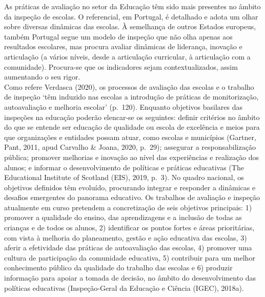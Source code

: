 \documentclass[
]{book}
\theoremstyle{definition}
\theoremstyle{definition}
\theoremstyle{definition}
\theoremstyle{definition}
\theoremstyle{remark}
\begin{document}
As práticas de avaliação no setor da Educação têm sido mais presentes no âmbito da inspeção de escolas. O referencial, em Portugal, é detalhado e adota um olhar sobre diversas dinâmicas das escolas. À semelhança de outros Estados europeus, também Portugal segue um modelo de inspeção que não olha apenas aos resultados escolares, mas procura avaliar dinâmicas de liderança, inovação e articulação (a vários níveis, desde a articulação curricular, à articulação com a comunidade). Procura-se que os indicadores sejam contextualizados, assim aumentando o seu rigor.\\
Como refere Verdasca (2020), os processos de avaliação das escolas e o trabalho de inspeção `têm induzido nas escolas a introdução de práticas de monitorização, autoavaliação e melhoria escolar' (p.~120). Enquanto objetivos basilares das inspeções na educação poderão elencar-se os seguintes: definir critérios no âmbito do que se entende ser educação de qualidade ou escola de excelência e meios para que organizações e entidades possam atuar, como escolas e municípios (Gartner, Pant, 2011, apud Carvalho \& Joana, 2020, p.~29); assegurar a responsabilização pública; promover melhorias e inovação ao nível das experiências e realização dos alunos; e informar o desenvolvimento de políticas e práticas educativas (The Educational Institute of Scotland (EIS), 2019, p.~3). No quadro nacional, os objetivos definidos têm evoluído, procurando integrar e responder a dinâmicas e desafios emergentes do panorama educativo. Os trabalhos de avaliação e inspeção atualmente em curso pretendem a concretização de seis objetivos principais: 1) promover a qualidade do ensino, das aprendizagens e a inclusão de todas as crianças e de todos os alunos, 2) identificar os pontos fortes e áreas prioritárias, com vista à melhoria do planeamento, gestão e ação educativa das escolas, 3) aferir a efetividade das práticas de autoavaliação das escolas, 4) promover uma cultura de participação da comunidade educativa, 5) contribuir para um melhor conhecimento público da qualidade do trabalho das escolas e 6) produzir informação para apoiar a tomada de decisão, no âmbito do desenvolvimento das políticas educativas (Inspeção-Geral da Educação e Ciência (IGEC), 2018a).\\
\end{document}

